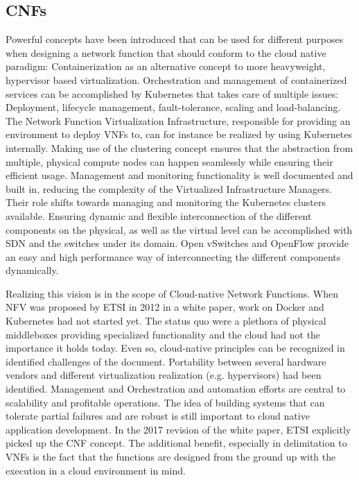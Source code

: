 \subsection{CNFs}
Powerful concepts have been introduced that can be used for different purposes when designing a network function that should conform to the cloud native paradigm: Containerization as an alternative concept to more heavyweight, hypervisor based virtualization. Orchestration and management of containerized services can be accomplished by Kubernetes that takes care of multiple issues: Deployment, lifecycle management, fault-tolerance, scaling and load-balancing. The Network Function Virtualization Infrastructure, responsible for providing an environment to deploy VNFs to, can for instance be realized by using Kubernetes internally. Making use of the clustering concept ensures that the abstraction from multiple, physical compute nodes can happen seamlessly while ensuring their efficient usage. Management and monitoring functionality is well documented and built in, reducing the complexity of the Virtualized Infrastructure Managers. Their role shifts towards managing and monitoring the Kubernetes clusters available. Ensuring dynamic and flexible interconnection of the different components on the physical, as well as the virtual level can be accomplished with SDN and the switches under its domain. Open vSwitches and OpenFlow provide an easy and high performance way of interconnecting the different components dynamically. 

Realizing this vision is in the scope of Cloud-native Network Functions. When NFV was proposed by ETSI in 2012 in a white paper, work on Docker and Kubernetes had not started yet. The status quo were a plethora of physical middleboxes providing specialized functionality and the cloud had not the importance it holds today. Even so, cloud-native principles can be recognized in identified challenges of the document. Portability between several hardware vendors and different virtualization realization (e.g. hypervisors) had been identified. Management and Orchestration and automation efforts are central to scalability and profitable operations. The idea of building systems that can tolerate partial failures and are robust is still important to cloud native application development.
In the 2017 revision of the white paper, ETSI explicitly picked up the CNF concept. The additional benefit, especially in delimitation to VNFs is the fact that the functions are designed from the ground up with the execution in a cloud environment in mind. 


